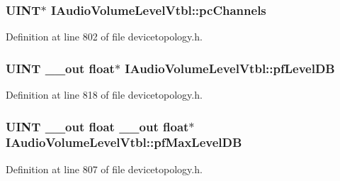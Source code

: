 \subsubsection[{\texorpdfstring{pc\+Channels}{pcChannels}}]{ {\bf U\+I\+NT}$\ast$ I\+Audio\+Volume\+Level\+Vtbl\+::pc\+Channels}\hypertarget{struct_i_audio_volume_level_vtbl_a07a656fb8c883d369aacc84d467ab8a6}{}\label{struct_i_audio_volume_level_vtbl_a07a656fb8c883d369aacc84d467ab8a6}


Definition at line 802 of file devicetopology.\+h.

\subsubsection[{\texorpdfstring{pf\+Level\+DB}{pfLevelDB}}]{ {\bf U\+I\+NT} {\bf \+\_\+\+\_\+out} float$\ast$ I\+Audio\+Volume\+Level\+Vtbl\+::pf\+Level\+DB}\hypertarget{struct_i_audio_volume_level_vtbl_a610f938cada1030d65947ee6efef41bd}{}\label{struct_i_audio_volume_level_vtbl_a610f938cada1030d65947ee6efef41bd}


Definition at line 818 of file devicetopology.\+h.

\subsubsection[{\texorpdfstring{pf\+Max\+Level\+DB}{pfMaxLevelDB}}]{ {\bf U\+I\+NT} {\bf \+\_\+\+\_\+out} float {\bf \+\_\+\+\_\+out} float$\ast$ I\+Audio\+Volume\+Level\+Vtbl\+::pf\+Max\+Level\+DB}\hypertarget{struct_i_audio_volume_level_vtbl_a4930f9d6a1f0d362c1c859327b10e14f}{}\label{struct_i_audio_volume_level_vtbl_a4930f9d6a1f0d362c1c859327b10e14f}


Definition at line 807 of file devicetopology.\+h.

